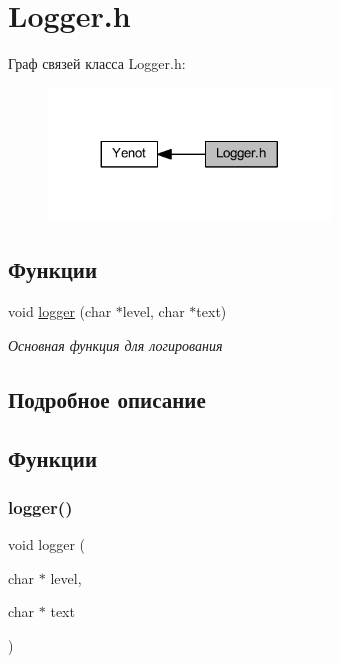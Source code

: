 \hypertarget{group__loggerh}{}\section{Logger.\+h}
\label{group__loggerh}
Граф связей класса Logger.\+h\+:\nopagebreak
\begin{figure}[H]
\begin{center}
\leavevmode
\includegraphics[width=212pt]{group__loggerh}
\end{center}
\end{figure}
\subsection*{Функции}
\begin{DoxyCompactItemize}
\item 
void \mbox{\hyperlink{group__loggerh_ga0d6abeb129096910c85ae6cba8bb59cf}{logger}} (char $\ast$level, char $\ast$text)
\begin{DoxyCompactList}\small\item\em Основная функция для логирования \end{DoxyCompactList}\end{DoxyCompactItemize}


\subsection{Подробное описание}


\subsection{Функции}
\mbox{\label{group__loggerh_ga0d6abeb129096910c85ae6cba8bb59cf}} 
\subsubsection{\texorpdfstring{logger()}{logger()}}
{\footnotesize\ttfamily void logger (\begin{DoxyParamCaption}\item[{char $\ast$}]{level,  }\item[{char $\ast$}]{text }\end{DoxyParamCaption})}



